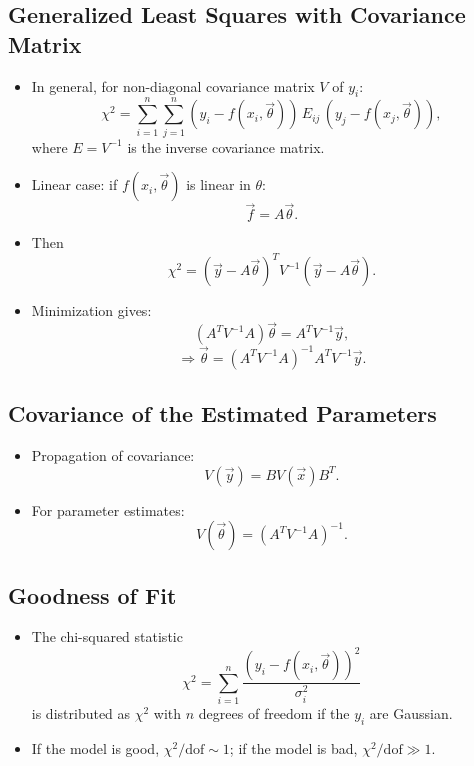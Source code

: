 \subsection{Generalized Least Squares with Covariance Matrix}
\begin{itemize}
      \item In general, for non-diagonal covariance matrix $V$ of $y_i$:
            \[
                  \chi^2 = \sum_{i=1}^{n} \sum_{j=1}^{n}
                  (y_i - f(x_i, \vec{\theta})) \, E_{ij} \, (y_j - f(x_j, \vec{\theta})),
            \]
            where $E = V^{-1}$ is the inverse covariance matrix.
      \item Linear case: if $f(x_i, \vec{\theta})$ is linear in $\theta$:
            \[
                  \vec{f} = A \vec{\theta}.
            \]
      \item Then
            \[
                  \chi^2 = (\vec{y} - A \vec{\theta})^T V^{-1} (\vec{y} - A \vec{\theta}).
            \]
      \item Minimization gives:
            \[
                  (A^T V^{-1} A) \vec{\theta} = A^T V^{-1} \vec{y},
            \]
            \[
                  \Rightarrow \vec{\theta} = (A^T V^{-1} A)^{-1} A^T V^{-1} \vec{y}.
            \]
\end{itemize}

\subsection{Covariance of the Estimated Parameters}
\begin{itemize}
      \item Propagation of covariance:
            \[
                  V(\vec{y}) = B V(\vec{x}) B^T.
            \]
      \item For parameter estimates:
            \[
                  V(\vec{\theta}) = (A^T V^{-1} A)^{-1}.
            \]
\end{itemize}

\subsection{Goodness of Fit}
\begin{itemize}
      \item The chi-squared statistic
            \[
                  \chi^2 = \sum_{i=1}^{n} \frac{(y_i - f(x_i, \vec{\theta}))^2}{\sigma_i^2}
            \]
            is distributed as $\chi^2$ with $n$ degrees of freedom if the $y_i$ are Gaussian.
      \item If the model is good, $\chi^2/\text{dof} \sim 1$; if the model is bad, $\chi^2/\text{dof} \gg 1$.
\end{itemize}
